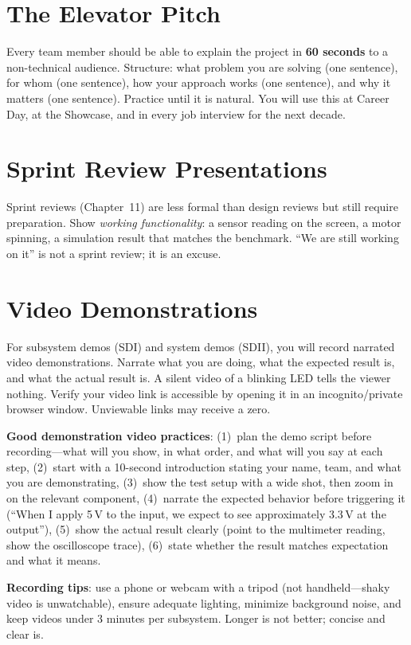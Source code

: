 \section{The Elevator Pitch}
Every team member should be able to explain the project in \textbf{60 seconds} to a non-technical audience. Structure: what problem you are solving (one sentence), for whom (one sentence), how your approach works (one sentence), and why it matters (one sentence). Practice until it is natural. You will use this at Career Day, at the Showcase, and in every job interview for the next decade.

\section{Sprint Review Presentations}
Sprint reviews (Chapter~11) are less formal than design reviews but still require preparation. Show \emph{working functionality}: a sensor reading on the screen, a motor spinning, a simulation result that matches the benchmark. ``We are still working on it'' is not a sprint review; it is an excuse.

\section{Video Demonstrations}
For subsystem demos (SDI) and system demos (SDII), you will record narrated video demonstrations. Narrate what you are doing, what the expected result is, and what the actual result is. A silent video of a blinking LED tells the viewer nothing. Verify your video link is accessible by opening it in an incognito/private browser window. Unviewable links may receive a zero.

\textbf{Good demonstration video practices}: (1)~plan the demo script before recording---what will you show, in what order, and what will you say at each step, (2)~start with a 10-second introduction stating your name, team, and what you are demonstrating, (3)~show the test setup with a wide shot, then zoom in on the relevant component, (4)~narrate the expected behavior before triggering it (``When I apply 5\,V to the input, we expect to see approximately 3.3\,V at the output''), (5)~show the actual result clearly (point to the multimeter reading, show the oscilloscope trace), (6)~state whether the result matches expectation and what it means.

\textbf{Recording tips}: use a phone or webcam with a tripod (not handheld---shaky video is unwatchable), ensure adequate lighting, minimize background noise, and keep videos under 3 minutes per subsystem. Longer is not better; concise and clear is.


